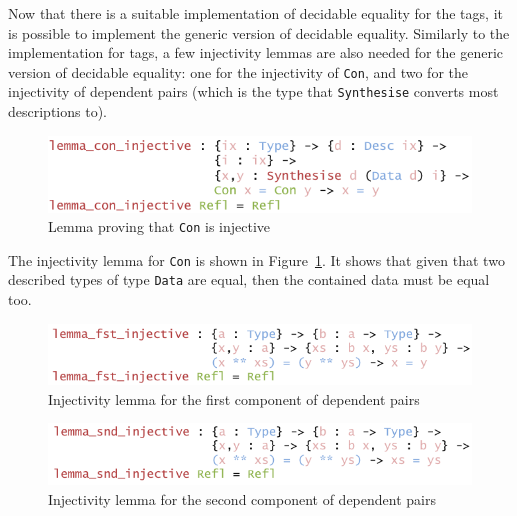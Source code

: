 \documentclass{ituthesis}
\newcommand{\ttconstructor}[1]{\textcolor{constructor-color}{\texttt{#1}}}
\newcommand{\tttype}[1]{\textcolor{type-color}{\texttt{#1}}}
\newcommand{\ttdec}[1]{\textcolor{declared-var-color}{\texttt{#1}}}
\theoremstyle{break}
\begin{document}
Now that there is a suitable implementation of decidable equality for the tags, it is possible to implement the generic version of decidable equality.
Similarly to the implementation for tags, a few injectivity lemmas are also needed for the generic version of decidable equality: 
one for the injectivity of \ttconstructor{Con}, and two for the injectivity of dependent pairs (which is the type that \ttdec{Synthesise} converts most descriptions to).

\begin{figure}[ht]
\begin{center}
    \includegraphics[scale=0.5]{Figures/GenericDecEqLemma1.png}
\end{center}
\caption{Lemma proving that \ttconstructor{Con} is injective}
\label{fig:dglem1}
\end{figure}

The injectivity lemma for \ttconstructor{Con} is shown in Figure~\ref{fig:dglem1}.
It shows that given that two described types of type \tttype{Data} are equal, then the contained data must be equal too.

\begin{figure}[ht]
\begin{center}
    \includegraphics[scale=0.5]{Figures/GenericDecEqLemma2.png}
\end{center}
\caption{Injectivity lemma for the first component of dependent pairs}
\label{fig:dglem2}
\end{figure}

\begin{figure}[ht]
\begin{center}
    \includegraphics[scale=0.5]{Figures/GenericDecEqLemma3.png}
\end{center}
\caption{Injectivity lemma for the second component of dependent pairs}
\label{fig:dglem3}
\end{figure}
\end{document}
